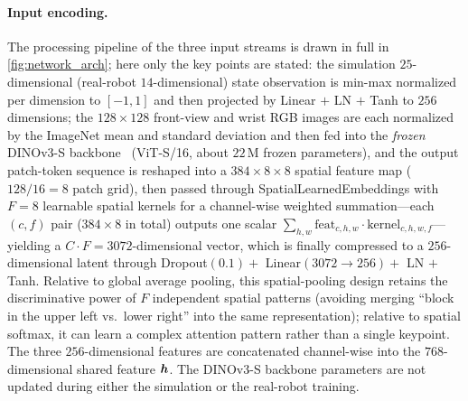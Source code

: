 \paragraph{Input encoding.} The processing pipeline of the three input streams is drawn in full in \cref{fig:network_arch}; here only the key points are stated: the simulation $25$-dimensional (real-robot $14$-dimensional) state observation is min-max normalized per dimension to $[-1, 1]$ and then projected by Linear $+$ LN $+$ Tanh to $256$ dimensions; the $128 \times 128$ front-view and wrist RGB images are each normalized by the ImageNet mean and standard deviation and then fed into the \emph{frozen} DINOv3-S backbone~\cite{simeoni2025dinov3} (ViT-S/16, about $22$\,M frozen parameters), and the output patch-token sequence is reshaped into a $384 \times 8 \times 8$ spatial feature map ($128/16 = 8$ patch grid), then passed through SpatialLearnedEmbeddings with $F = 8$ learnable spatial kernels for a channel-wise weighted summation---each $(c, f)$ pair ($384 \times 8$ in total) outputs one scalar $\sum_{h, w} \text{feat}_{c, h, w} \cdot \text{kernel}_{c, h, w, f}$---yielding a $C \cdot F = 3072$-dimensional vector, which is finally compressed to a $256$-dimensional latent through Dropout$(0.1) +$ Linear$(3072 \to 256) +$ LN $+$ Tanh. Relative to global average pooling, this spatial-pooling design retains the discriminative power of $F$ independent spatial patterns (avoiding merging ``block in the upper left vs.\ lower right'' into the same representation); relative to spatial softmax, it can learn a complex attention pattern rather than a single keypoint. The three $256$-dimensional features are concatenated channel-wise into the $768$-dimensional shared feature $\bm{h}$. The DINOv3-S backbone parameters are not updated during either the simulation or the real-robot training.

